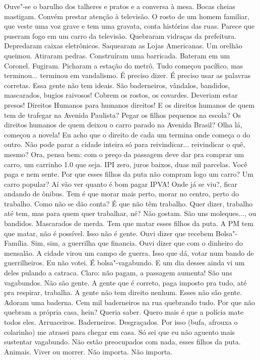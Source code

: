 Ouve"-se o barulho dos talheres e pratos e a
conversa à mesa. Bocas cheias mastigam. Convém prestar atenção à
televisão. O rosto de um homem familiar, que veste uma voz grave e tem
uma gravata, conta histórias das ruas. Parece que puseram fogo em um
carro da televisão. Quebraram vidraças da prefeitura. Depredaram caixas
eletrônicos. Saquearam as Lojas Americanas. Um orelhão queimou. Atiraram
pedras. Construíram uma barricada. Bateram em um Coronel. Fugiram.
Picharam a estação do metrô. Tudo começou pacífico, mas terminou...
terminou em vandalismo. É preciso dizer. É preciso usar as palavras
corretas. Essa gente não tem ideais. São baderneiros, vândalos,
bandidos, mascarados, bugios raivosos! Cobrem os rostos, os covardes.
Deveriam estar presos! Direitos Humanos para humanos direitos! E os
direitos humanos de quem tem de trafegar na Avenida Paulista? Pegar os
filhos pequenos na escola? Os direitos humanos de quem deixou o carro
parado na Avenida Brasil? Olha lá, começou a novela! Eu acho que o
direito de cada um termina onde começa o do outro. Não pode parar a
cidade inteira só para reivindicar... reivindicar o quê, mesmo? Ora,
pensa bem: com o preço da passagem deve dar pra comprar um carro, um
carrinho 1.0 que seja. IPI zero, juros baixos, duas mil parcelas. Você
paga e nem sente. Por que esses filhos da puta não compram logo um
carro? Um carro popular? Aí vão ver quanto é bom pagar IPVA! Onde já se
viu?, ficar andando de ônibus. Tem é que morar mais perto, morar no
centro, perto do trabalho. Como não se dão conta? É que não têm
trabalho. Quer dizer, trabalho até tem, mas para quem quer trabalhar,
né? Não gostam. São uns moleques..., ou bandidos. Mascarados de merda.
Tem que matar esses filhos da puta. A PM tem que matar, não é possível.
Isso não é gente. Ouvi dizer que recebem Bolsa"-Família. Sim, sim, a
guerrilha que financia. Ouvi dizer que com o dinheiro do mensalão. A
cidade virou um campo de guerra. Isso que dá, votar num bando de
guerrilheiros. Eu não votei. É bolsa"-vagabundo. E um dia desses ainda vi
um deles pulando a catraca. Claro: não pagam, a passagem aumenta! São
uns vagabundos. Não são gente. A gente que é correto, paga imposto pra
tudo, até pra respirar, trabalha. A gente não tem direito nenhum. Esses
não são gente. Adoram uma baderna. Cem mil baderneiros na rua quebrando
tudo. Por que não quebram a própria casa, hein? Queria saber. Quero mais
é que a polícia mate todos eles. Arruaceiros. Baderneiros. Desgraçados.
Por isso (bufa, afrouxa o colarinho) me atrasei para chegar em casa. Só
sei que eu não aguento mais sustentar vagabundo. Não estão preocupados
com nada, esses filhos da puta. Animais. Viver ou morrer. Não importa.
Não importa.

